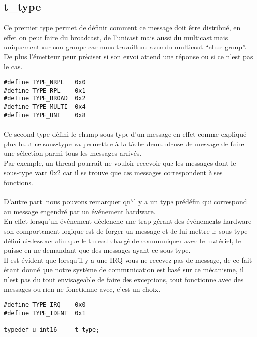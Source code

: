 \documentclass[10pt,a4wide]{article}
\begin{document}
\subsection{t\_type}
Ce premier type permet de d\'efinir comment ce message doit \^etre distribu\'e, en effet on peut faire du broadcast, de l'unicast mais aussi
du multicast mais uniquement sur son groupe car nous travaillons avec du multicast ``close group''.\\
De plus l'\'emetteur peur pr\'eciser si son envoi attend une r\'eponse ou si ce n'est pas le cas.
\begin{verbatim}
#define TYPE_NRPL	0x0
#define TYPE_RPL	0x1
#define TYPE_BROAD	0x2
#define TYPE_MULTI	0x4
#define TYPE_UNI	0x8
\end{verbatim}
\paragraph{}
Ce second type d\'efini le champ sous-type d'un message en effet comme expliqu\'e plus haut ce sous-type va permettre \`a la t\^ache demandeuse
de message de faire une s\'election parmi tous les messages arriv\'es.\\
Par exemple, un thread pourrait ne vouloir recevoir que les messages dont le sous-type vaut 0x2 car il se trouve que ces messages
correspondent \`a ses fonctions.\\
\paragraph{}
D'autre part, nous pouvons remarquer qu'il y a un type pr\'ed\'efin qui correspond au message engendr\'e par un \'ev\'enement hardware.\\
En effet lorsqu'un \'ev\'enement d\'eclenche une trap g\'erant des \'ev\'enements hardware son comportement logique est de forger un message
et de lui mettre le sous-type d\'efini ci-dessous afin que le thread charg\'e de communiquer avec le mat\'eriel, le puisse en ne demandant que
des messages ayant ce sous-type.\\
Il est \'evident que lorsqu'il y a une IRQ vous ne recevez pas de message, de ce fait \'etant donn\'e que notre syst\`eme de communication est bas\'e
sur ce m\'ecanisme, il n'est pas du tout envisageable de faire des exceptions, tout fonctionne avec des messages ou rien ne fonctionne avec, c'est
un choix.
\begin{verbatim}
#define TYPE_IRQ	0x0
#define TYPE_IDENT	0x1

typedef u_int16		t_type;
\end{verbatim}
\end{document}
